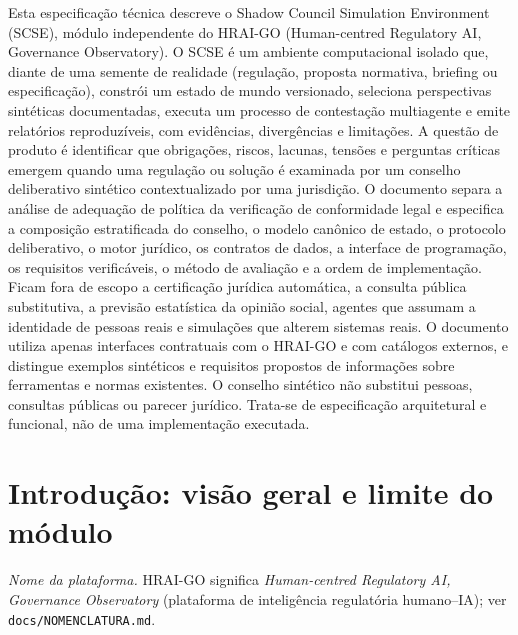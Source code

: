 \documentclass[12pt,a4paper,oneside,english,brazil]{abntex2}
\begin{document}

\pretextual
\imprimirfolhaderostorelatorio

\begin{resumorelatorio}
Esta especificação técnica descreve o Shadow Council Simulation Environment (SCSE), módulo independente do
HRAI-GO (Human-centred Regulatory AI, Governance Observatory). O SCSE é um ambiente computacional isolado que,
diante de uma semente de realidade (regulação, proposta normativa, briefing ou especificação), constrói um
estado de mundo versionado, seleciona perspectivas sintéticas documentadas, executa um processo de
contestação multiagente e emite relatórios reproduzíveis, com evidências, divergências e limitações. A
questão de produto é identificar que obrigações, riscos, lacunas, tensões e perguntas críticas emergem quando
uma regulação ou solução é examinada por um conselho deliberativo sintético contextualizado por uma
jurisdição. O documento separa a análise de adequação de política da verificação de conformidade legal e
especifica a composição estratificada do conselho, o modelo canônico de estado, o protocolo deliberativo, o
motor jurídico, os contratos de dados, a interface de programação, os requisitos verificáveis, o método de
avaliação e a ordem de implementação. Ficam fora de escopo a certificação jurídica automática, a consulta
pública substitutiva, a previsão estatística da opinião social, agentes que assumam a identidade de pessoas
reais e simulações que alterem sistemas reais. O documento utiliza apenas interfaces contratuais com o
HRAI-GO e com catálogos externos, e distingue exemplos sintéticos e requisitos propostos de informações sobre
ferramentas e normas existentes. O conselho sintético não substitui pessoas, consultas públicas ou parecer
jurídico. Trata-se de especificação arquitetural e funcional, não de uma implementação executada.
\end{resumorelatorio}

\listoftables*
\cleardoublepage

\tableofcontents*
\cleardoublepage

\textual

\chapter{Introdução: visão geral e limite do módulo}
\noindent\textit{Nome da plataforma.} HRAI-GO significa \textit{Human-centred Regulatory AI, Governance Observatory} (plataforma de inteligência regulatória humano--IA); ver \texttt{docs/NOMENCLATURA.md}.
\end{document}
